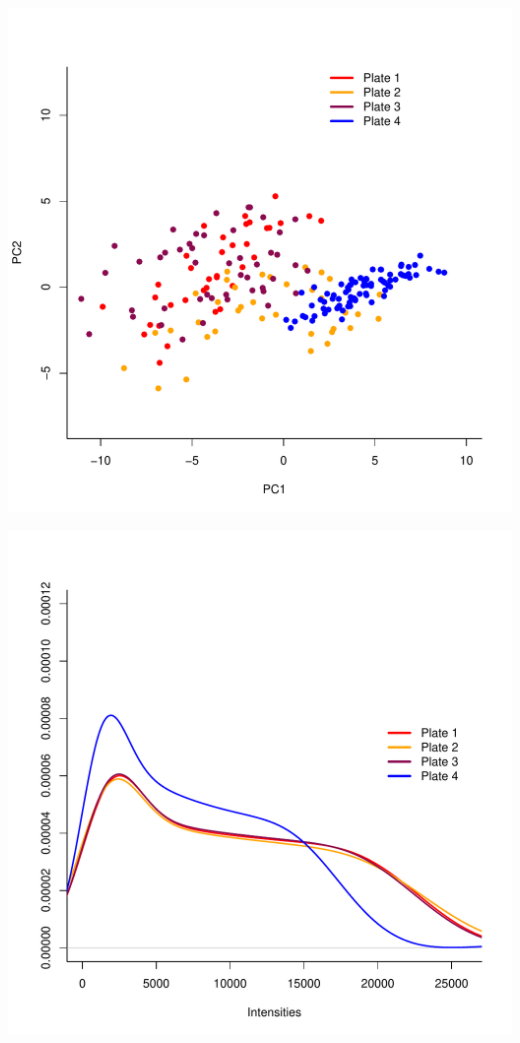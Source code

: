 \documentclass[12pt]{article}
\begin{document}
\begin{knitrout}
\includegraphics[width=\maxwidth]{figure/unnamed-chunk-62} 

\includegraphics[width=\maxwidth]{figure/unnamed-chunk-63} 

\end{knitrout}
\end{document}
